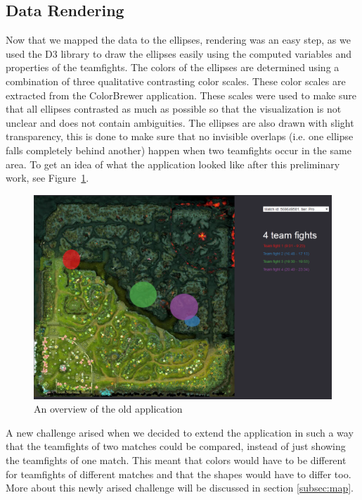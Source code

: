\documentclass[11pt,twoside,a4paper]{article}
\begin{document}
\subsection{Data Rendering}
\label{subsec:datarendering}
Now that we mapped the data to the ellipses, rendering was an easy step, as we used the D3 library to draw the ellipses easily using the computed variables and properties of the teamfights. The colors of the ellipses are determined using a combination of three qualitative contrasting color scales. These color scales are extracted from the ColorBrewer application. %
These scales were used to make sure that all ellipses contrasted as much as possible so that the visualization is not unclear and does not contain ambiguities. 
The ellipses are also drawn with slight transparency, this is done to make sure that no invisible overlaps (i.e. one ellipse falls completely behind another) happen when two teamfights occur in the same area.
\newline\newline
To get an idea of what the application looked like after this preliminary work, see Figure~\ref{fig:oldapp}.

\begin{figure}[ht]
\centering
\includegraphics[width=\textwidth]{oldApp.png}
\caption{An overview of the old application}
\label{fig:oldapp}
\end{figure}

A new challenge arised when we decided to extend the application in such a way that the teamfights of two matches could be compared, instead of just showing the teamfights of one match. This meant that colors would have to be different for teamfights of different matches and that the shapes would have to differ too. More about this newly arised challenge will be discussed in section \ref{subsec:map}.
\end{document}

